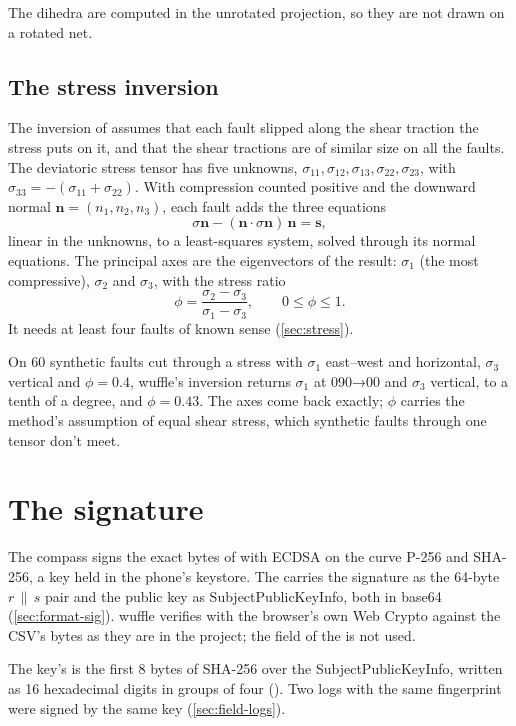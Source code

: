 The dihedra are computed in the unrotated projection, so they are not drawn on a rotated net.

\subsection{The stress inversion}\label{sec:m-michael}

The inversion of \textcite{michael1984} assumes that each fault slipped along the shear traction the stress
puts on it, and that the shear tractions are of similar size on all the faults. The deviatoric stress
tensor has five unknowns, $\sigma_{11}, \sigma_{12}, \sigma_{13}, \sigma_{22}, \sigma_{23}$, with
$\sigma_{33} = -(\sigma_{11} + \sigma_{22})$. With compression counted positive and the downward normal
$\mathbf{n} = (n_1, n_2, n_3)$, each fault adds the three equations
\[ \sigma\mathbf{n} - (\mathbf{n}\cdot\sigma\mathbf{n})\,\mathbf{n} = \mathbf{s}, \]
linear in the unknowns, to a least-squares system, solved through its normal equations. The principal
axes are the eigenvectors of the result: $\sigma_1$ (the most compressive), $\sigma_2$ and $\sigma_3$,
with the stress ratio
\[ \phi = \frac{\sigma_2 - \sigma_3}{\sigma_1 - \sigma_3}, \qquad 0 \le \phi \le 1. \]
It needs at least four faults of known sense (\cref{sec:stress}).

\begin{note}
On 60 synthetic faults cut through a stress with $\sigma_1$ east--west and horizontal, $\sigma_3$
vertical and $\phi = 0.4$, wuffle's inversion returns $\sigma_1$ at 090→00 and $\sigma_3$ vertical, to a
tenth of a degree, and $\phi = 0.43$. The axes come back exactly; $\phi$ carries the method's assumption
of equal shear stress, which synthetic faults through one tensor don't meet.
\end{note}

\section{The signature}\label{sec:m-signature}

The compass signs the exact bytes of  with ECDSA on the curve P-256 and SHA-256, a
key held in the phone's keystore. The  carries the signature as the 64-byte $r\,\|\,s$ pair and
the public key as SubjectPublicKeyInfo, both in base64 (\cref{sec:format-sig}). wuffle verifies with the
browser's own Web Crypto against the CSV's bytes as they are in the project; the  field of the
 is not used.

The key's  is the first 8 bytes of SHA-256 over the SubjectPublicKeyInfo, written as 16
hexadecimal digits in groups of four (). Two logs with the same fingerprint were
signed by the same key (\cref{sec:field-logs}).
